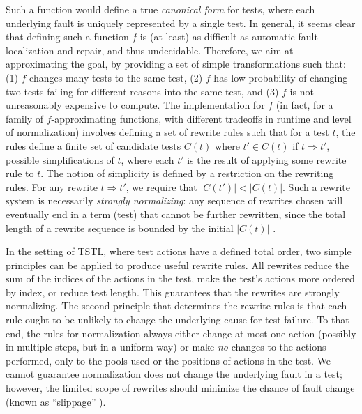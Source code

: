 Such a function would define a true \emph{canonical form} for tests, where each underlying fault is uniquely represented by a single
test.  In general, it seems clear that defining such a function
$f$ is (at least) as difficult as automatic fault localization and
repair, and thus undecidable.  Therefore, we aim at approximating the
goal, by providing a set of simple transformations such that: (1) $f$
changes many tests to the same test, (2) $f$ has low probability of
changing two tests failing for different reasons into the same test,
and (3) $f$ is not unreasonably expensive to compute.  The implementation
for $f$ (in fact, for a family of $f$-approximating functions, with
different tradeoffs in runtime and level of normalization) involves
defining a set of rewrite rules such that for a test $t$, the rules
define a finite set of candidate tests $C(t)$ where $t' \in C(t)$  if $t \Rightarrow t'$, possible
simplifications of $t$, where each $t'$ is the result of applying some
rewrite rule to $t$.  The notion of simplicity is defined by a
restriction on the rewriting rules.  For any rewrite $t \Rightarrow t'$, we require that $|C(t')| < |C(t)|$.  Such
a rewrite system is necessarily \emph{strongly normalizing}: any
sequence of rewrites chosen will eventually end in a term (test)
that cannot be further rewritten, since the total length of a rewrite
sequence is bounded by the initial $|C(t)|$ \cite{term1}.


In the setting of TSTL, where test actions have a defined total
order, two simple principles can be applied to produce useful
rewrite rules.  All rewrites reduce the sum of the
indices of the actions in the test, make the test's
actions more ordered by index, or reduce test length.  This guarantees that the rewrites are
strongly normalizing.
The second principle that determines the rewrite rules is that each
rule ought to be unlikely to change the underlying cause for test
failure.  To that end, the rules for normalization always either change at most
one action (possibly in multiple steps, but in a uniform way) or make
\emph{no} changes to the actions performed, only to the pools used or the
positions of actions in the test.  We cannot guarantee
normalization does not change the underlying fault in a test; however,
the limited scope of rewrites should minimize the chance of fault
change (known as ``slippage'' \cite{PLDI13,slippage}).

